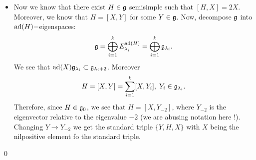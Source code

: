 \begin{itemize}
    Suppose that $H\notin (\fr{g}^X)^\perp$, so $K(H,\fr{g}^X)\neq0$. We know that $\fr{g}^X$ is $\ad(H)-$invariant:
    \begin{equation}
        \ad(X)\ad(H)Y=(\ad(H)\ad(X)+\ad([X,H]))Y=-2\ad(X)Y = 0.
    \end{equation}
    So, since $\ad(H)$ is semisimple, its restriction to $\fr{g}^X$ is also semisimple and we have the eigenspace decomposition
    \begin{equation}
        \fr{g}^X=\bigoplus_{i=1}^k E_{\lambda_i}^{\ad(H)|_{\fr{g}^X}}=\bigoplus_{i=1}^k \fr{g}_{\lambda_i}^X.
    \end{equation}
    In this case we see that if $\lambda_i\neq0$, then 
    \begin{equation}
        K(H,\fr{g}_{\lambda_i}^X)=\frac{1}{\lambda_i}K(H,[H,\fr{g}_{\lambda_i}^X])=0.
    \end{equation}
    So there exist $Z\in\fr{g}_0^X=(\fr{g}^X)^H$ such that $K(H,Z)\neq0$.\par

    If $Z$ is nilpotent, then since $[Z,H]=0$, we see that $K(Z,H)=\Tr\ad(Z)\circ\ad(H)=0$ because 
    $\ad(Z)\circ\ad(H)$ is nilpotent. Therefore, we will assume that $Z_s\neq0$. Here we observe that 
    $Z_s\in(\fr{g}_X)^H$. In fact, whenever $\ad([W,Z])=0$, we have $\ad([W,Z_s])=0$ and $[W,Z_s]=0$.
    \par 
    Finally, we see that since $Z_s\neq0$, then $\fr{g}^{Z_s}\overset{\neq}{\subset}\fr{g}$ and 
    $[\fr{g}^{Z_s},\fr{g}^{Z_s}]$ is a proper semisimple subalgebra of $\fr{g}$ (we are using the fact that 
    centralizers of single elements $\fr{g}^W$ are reductive algebras). However, since $Z_s\in(\fr{g}_X)^H$, we 
    have $H,X \in \fr{g}^{Z_s}$. But $2X=[H,X]\in [\fr{g}^{Z_s},\fr{g}^{Z_s}]$, which contradicts the Induction
    hypothesis.

    \item Now we know that there exist $H\in\mathfrak{g}$ semisimple such that $[H,X]=2X$. Moreover, we know that 
    $H=[X,Y]$ for some $Y\in\mathfrak{g}$. Now, decompose $\fr{g}$ into $\ad(H)-$eigenspaces:
    \begin{equation}
        \mathfrak{g}=\bigoplus_{i=1}^k E_{\lambda_i}^{\text{ad}(H)}=\bigoplus_{i=1}^k\mathfrak{g}_{\lambda_i}.
    \end{equation}
    We see that $\text{ad}(X)\mathfrak{g}_{\lambda_i}\subset \mathfrak{g}_{\lambda_i+2}$. Moreover
    \begin{equation}
        H=[X,Y]=\sum_{i=1}^k[X,Y_i],\; Y_i\in\mathfrak{g}_{\lambda_i}.
    \end{equation}
    Therefore, since $H\in\mathfrak{g}_0$,
     we see that $H=[X,Y_{-2}]$, where $Y_{-2}$ is the eigenvector relative to the eigenvalue $-2$ 
     (we are abusing notation here !). Changing 
     $Y\to Y_{-2}$ we get the standard triple $\{Y,H,X\}$ with $X$ being the nilpositive element fo the standard triple.
\end{itemize}
\qed

